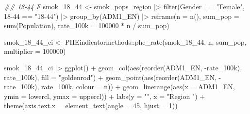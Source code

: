 \documentclass[
  letterpaper,
  DIV=11,
  numbers=noendperiod]{scrreprt}
\newenvironment{Shaded}{\begin{snugshade}}{\end{snugshade}}
\newcommand{\AttributeTok}[1]{\textcolor[rgb]{0.40,0.45,0.13}{#1}}
\newcommand{\DecValTok}[1]{\textcolor[rgb]{0.68,0.00,0.00}{#1}}
\newcommand{\DocumentationTok}[1]{\textcolor[rgb]{0.37,0.37,0.37}{\textit{#1}}}
\newcommand{\FunctionTok}[1]{\textcolor[rgb]{0.28,0.35,0.67}{#1}}
\newcommand{\NormalTok}[1]{\textcolor[rgb]{0.00,0.23,0.31}{#1}}
\newcommand{\OtherTok}[1]{\textcolor[rgb]{0.00,0.23,0.31}{#1}}
\newcommand{\SpecialCharTok}[1]{\textcolor[rgb]{0.37,0.37,0.37}{#1}}
\newcommand{\StringTok}[1]{\textcolor[rgb]{0.13,0.47,0.30}{#1}}
\begin{document}
\begin{Shaded}
\begin{Highlighting}[]
\DocumentationTok{\#\# 18{-}44 F}
\NormalTok{smok\_18\_44 }\OtherTok{\textless{}{-}}\NormalTok{ smok\_pops\_region }\SpecialCharTok{|\textgreater{}}
    \FunctionTok{filter}\NormalTok{(Gender }\SpecialCharTok{==} \StringTok{"Female"}\NormalTok{, }\StringTok{\textasciigrave{}}\AttributeTok{18{-}44}\StringTok{\textasciigrave{}} \SpecialCharTok{==} \StringTok{"18{-}44"}\NormalTok{) }\SpecialCharTok{|\textgreater{}}
    \FunctionTok{group\_by}\NormalTok{(ADM1\_EN) }\SpecialCharTok{|\textgreater{}}
    \FunctionTok{reframe}\NormalTok{(}\AttributeTok{n =} \FunctionTok{n}\NormalTok{(), }
            \AttributeTok{sum\_pop =} \FunctionTok{sum}\NormalTok{(Population), }
            \AttributeTok{rate\_100k =} \DecValTok{100000} \SpecialCharTok{*}\NormalTok{ n }\SpecialCharTok{/}\NormalTok{ sum\_pop)}

\NormalTok{    smok\_18\_44\_ci }\OtherTok{\textless{}{-}}\NormalTok{ PHEindicatormethods}\SpecialCharTok{::}\FunctionTok{phe\_rate}\NormalTok{(smok\_18\_44, n, sum\_pop, }\AttributeTok{multiplier =} \DecValTok{100000}\NormalTok{)}

\NormalTok{smok\_18\_44\_ci }\SpecialCharTok{|\textgreater{}}
    \FunctionTok{ggplot}\NormalTok{() }\SpecialCharTok{+}
    \FunctionTok{geom\_col}\NormalTok{(}\FunctionTok{aes}\NormalTok{(}\FunctionTok{reorder}\NormalTok{(ADM1\_EN, }\SpecialCharTok{{-}}\NormalTok{rate\_100k), rate\_100k), }\AttributeTok{fill =} \StringTok{"goldenrod"}\NormalTok{) }\SpecialCharTok{+}
    \FunctionTok{geom\_point}\NormalTok{(}\FunctionTok{aes}\NormalTok{(}\FunctionTok{reorder}\NormalTok{(ADM1\_EN, }\SpecialCharTok{{-}}\NormalTok{rate\_100k), rate\_100k, }\AttributeTok{colour =}\NormalTok{ n)) }\SpecialCharTok{+}
    \FunctionTok{geom\_linerange}\NormalTok{(}\FunctionTok{aes}\NormalTok{(}\AttributeTok{x =}\NormalTok{ ADM1\_EN, }\AttributeTok{ymin =}\NormalTok{ lowercl, }\AttributeTok{ymax =}\NormalTok{ uppercl)) }\SpecialCharTok{+}
    \FunctionTok{labs}\NormalTok{(}\AttributeTok{y =} \StringTok{""}\NormalTok{, }
         \AttributeTok{x =} \StringTok{"Region}
\StringTok{         "}\NormalTok{) }\SpecialCharTok{+}
    \FunctionTok{theme}\NormalTok{(}\AttributeTok{axis.text.x =} \FunctionTok{element\_text}\NormalTok{(}\AttributeTok{angle =} \DecValTok{45}\NormalTok{, }\AttributeTok{hjust =} \DecValTok{1}\NormalTok{))}
\end{Highlighting}
\end{Shaded}
\end{document}
